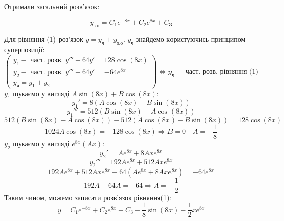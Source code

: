 \documentclass[14pt,a4paper]{scrartcl}
\theoremstyle{definition}
\theoremstyle{remark}
\theoremstyle{definition}
\theoremstyle{definition}
\begin{document}
Отримали загальний розв'язок:

$$
y_{\text{з.о}} = C_1e^{-8x} + C_2e^{8x} + C_3
$$

Для рівняння (1) роз'язок $y = y_{\text{ч}} + y_{\text{з.о}}$. $y_{\text{ч}}$ знайдемо користуючись принципом суперпозиції:
$$
\left(
\begin{gathered}
y_1 - \text{ част. розв. } y''' - 64y'  = 128 \cos{(8x)} \\
y_2 - \text{ част. розв. } y''' - 64y'  = - 64e^{8x}\\
y_{\text{ч}} = y_1 + y_2
\end{gathered} \right)
 \Leftrightarrow y_{\text{ч}}  - \text{ част. розв. рівняння (1) }
$$
$y_1$ шукаємо у вигляді $A \sin{(8x)} + B \cos{(8x)}  $:
$$
y_1' = 8(A\cos{(8x)}  - B\sin{(8x)} )
$$
$$
y_1''' = 512(B \sin{(8x)} - A\cos{(8x)} )
$$
$$
512( B\sin{(8x)} -A \cos{(8x)} ) - 512 (A\cos{(8x)}  - B\sin{(8x)} )  = 128 \cos{(8x)}
$$
$$
1024 A \cos{(8x)} = - 128 \cos{(8x)} \Longrightarrow  B =0  \quad A = - \frac{1}{8}
$$
$y_2$ шукаємо у вигляді $e^{8x}(Ax)$:
$$
y_2' = Ae^{8x} + 8Axe^{8x}
$$
$$
y_2''' = 192 A e^{8x} + 512 A x e^{8x}
$$
$$
192 A e^{8x} + 512 A x e^{8x} - 64(Ae^{8x} + 8Axe^{8x}) = -64e^{8x}
$$
$$
192 A - 64 A = -64  \Longrightarrow A = -\frac{1}{2}
$$
Таким чином, можемо записати розв'язок рівняння(1):
$$
y = C_1e^{-8x} + C_2e^{8x} + C_3 - \frac{1}{8}\sin{(8x)} - \frac{1}{2} xe^{8x}
$$

\pagebreak
\end{document}
